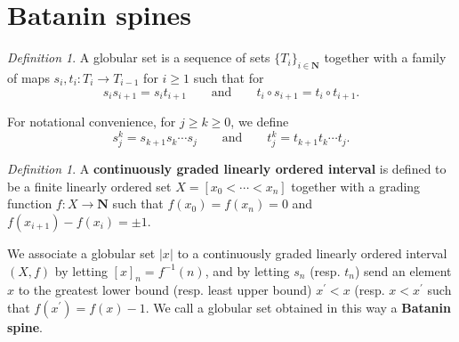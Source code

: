 \documentclass[10pt]{amsart}
\numberwithin{equation}{section}
\theoremstyle{plain}   %
\theoremstyle{remark}
\newtheorem{defn}[subsection]{Definition}
\theoremstyle{plain}
\newcommand{\dfn}{\textbf}
\begin{document}




\section{Batanin spines}
\begin{defn} A globular set is a sequence of sets \(\{T_i\}_{i\in \mathbf{N}}\) together with a family of maps \(s_i,t_i:T_i\to T_{i-1}\) for \(i\geq 1\) such that for \[s_is_{i+1}=s_it_{i+1} \qquad \text{and}\qquad t_i\circ s_{i+1} = t_i \circ t_{i+1}.\]
\end{defn}
For notational convenience, for \(j\geq k \geq 0\), we define \[s_j^k=s_{k+1}s_k\cdots s_j \qquad \text{and} \qquad t_j^k=t_{k+1}t_k\cdots t_j.\]
\begin{defn} A \dfn{continuously graded linearly ordered interval} is defined to be a finite linearly ordered set \(X=[x_0<\cdots<x_n]\) together with a grading function \(f:X\to \mathbf{N}\) such that \(f(x_0)=f(x_n)=0\) and \(f(x_{i+1})-f(x_i)=\pm 1\).
\end{defn}
We associate a globular set \(|x|\) to a continuously graded linearly ordered interval \((X,f)\) by letting \([x]_n=f^{-1}(n)\), and by letting \(s_n\) (resp. \(t_n\)) send an element \(x\) to the greatest lower bound (resp. least upper bound) \(x^\prime < x\) (resp. \(x<x^\prime\) such that \(f(x^\prime)=f(x)-1\).  We call a globular set obtained in this way a \dfn{Batanin spine}. 
\end{document}
